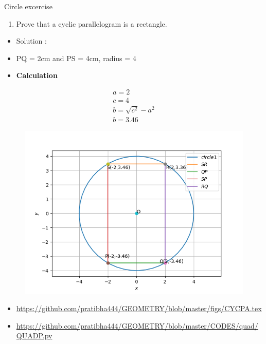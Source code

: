 \begin{frame}{Circle excercise}
\begin{enumerate}
\conti
\item Prove that a cyclic parallelogram is a rectangle.
\end{enumerate}
\seti
\begin{itemize}
\item Solution :
\begin{center}

\end{center}
\item PQ = 2cm and PS = 4cm, radius = 4
\end{itemize}
\end{frame}
\begin{frame}
\begin{itemize}
\item \textbf{Calculation}
\end{itemize}
\begin{align*}
a = 2\\
c = 4\\
b = \sqrt{c^2} - a ^2\\
b = 3.46
\end{align*}
\end{frame}
\begin{frame}
\begin{figure}
\includegraphics[scale=.4]{./CODES/quad/QUAD_P.png}
\end{figure}
\begin{itemize}
\item\url{https://github.com/pratibha444/GEOMETRY/blob/master/figs/CYCPA.tex}
\item\url{https://github.com/pratibha444/GEOMETRY/blob/master/CODES/quad/QUADP.py}
\end{itemize}
\end{frame}
